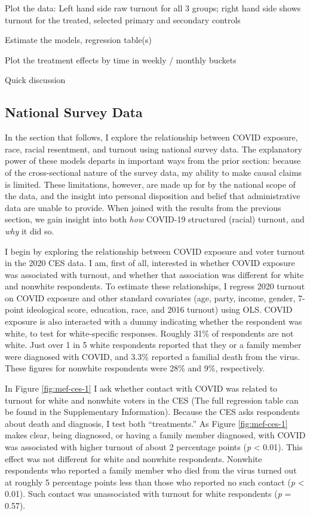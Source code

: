 \documentclass[
  12pt,
]{article}
\begin{document}
Plot the data: Left hand side raw turnout for all 3 groups; right hand side shows turnout for the treated, selected primary and secondary controls

Estimate the models, regression table(s)

Plot the treatment effects by time in weekly / monthly buckets

Quick discussion

\hypertarget{national-survey-data-1}{%
\subsection*{National Survey Data}\label{national-survey-data-1}}

In the section that follows, I explore the relationship between COVID exposure, race, racial resentment, and turnout using national survey data. The explanatory power of these models departs in important ways from the prior section: because of the cross-sectional nature of the survey data, my ability to make causal claims is limited. These limitations, however, are made up for by the national scope of the data, and the insight into personal disposition and belief that administrative data are unable to provide. When joined with the results from the previous section, we gain insight into both \emph{how} COVID-19 structured (racial) turnout, and \emph{why} it did so.

I begin by exploring the relationship between COVID exposure and voter turnout in the 2020 CES data. I am, first of all, interested in whether COVID exposure was associated with turnout, and whether that association was different for white and nonwhite respondents. To estimate these relationships, I regress 2020 turnout on COVID exposure and other standard covariates (age, party, income, gender, 7-point ideological score, education, race, and 2016 turnout) using OLS. COVID exposure is also interacted with a dummy indicating whether the respondent was white, to test for white-specific responses. Roughly 31\% of respondents are not white. Just over 1 in 5 white respondents reported that they or a family member were diagnosed with COVID, and 3.3\% reported a familial death from the virus. These figures for nonwhite respondents were 28\% and 9\%, respectively.

In Figure \ref{fig:mef-ces-1} I ask whether contact with COVID was related to turnout for white and nonwhite voters in the CES (The full regression table can be found in the Supplementary Information). Because the CES asks respondents about death and diagnosis, I test both ``treatments.'' As Figure \ref{fig:mef-ces-1} makes clear, being diagnosed, or having a family member diagnosed, with COVID was associated with higher turnout of about 2 percentage points (\emph{p} \textless{} 0.01). This effect was not different for white and nonwhite respondents. Nonwhite respondents who reported a family member who died from the virus turned out at roughly 5 percentage points less than those who reported no such contact (\emph{p} \textless{} 0.01). Such contact was unassociated with turnout for white respondents (\emph{p} = 0.57).
\end{document}

